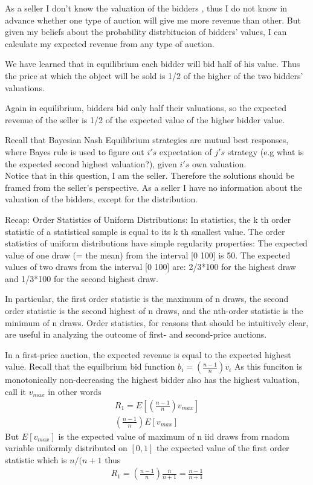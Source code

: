 \documentclass[11pt]{article} %
\begin{document}
      
      As a seller I don't know the valuation of the bidders , thus I do not know in advance whether one type of auction will give me more revenue than other. But given my beliefs about the probability distrbitucion of bidders' values, I can calculate my expected revenue from any type of auction.
      
      We have learned that in equilibrium each bidder will bid half of his value. Thus the price at which the object will be sold is 1/2 of the higher of the two bidders' valuations.
      
      Again in equilibrium, bidders bid only half their valuations, so the expected revenue of the seller is 1/2 of the expected value of the higher bidder value.
        
         Recall that Bayesian Nash Equilibrium strategies are mutual best responses, where Bayes rule is used to figure out $i's$ expectation of $j's$ strategy (e.g what is the expected second highest valuation?), given $i's$ own valuation. \\
    Notice that in this question, I am the seller. Therefore the solutions should be framed from the seller's perspective. As a seller I have no information about the valuation of the bidders, except for the distribution.
    
    Recap: Order Statistics of Uniform Distributions:
In statistics, the k th order statistic of a statistical sample is equal to its k th smallest value.  The order statistics of uniform distributions have simple regularity properties: The expected value of one draw (= the mean) from the interval [0 100] is 50. The expected values of two draws from the interval [0 100] are: 2/3*100 for the highest draw and 1/3*100 for the second highest draw. 

In particular, the first order statistic is the maximum of n draws, the second order statistic is the second highest of n draws, and the nth-order statistic is the minimum of n draws. Order statistics, for reasons that should be intuitively clear, are useful in analyzing the outcome of first- and second-price auctions.
     
     
     In a first-price auction, the expected revenue is equal to the expected highest value. Recall that the equilbrium bid function $b_i=(\frac{n-1}{n})v_i$ As this funciton is monotonically non-decreasing the highest bidder also has the highest valuation, call it $v_{max}$ in other words
     \begin{align*}
     R_1 = E[(\frac{n-1}{n})v_{max}] \\
     (\frac{n-1}{n})E[v_{max}]
     \end{align*}
But $E[v_{max}]$ is the expected value of maximum of n iid draws from rnadom variable uniformly distributed on $[0,1]$ the expected value of the first order statistic which is $n/(n+1$ thus 
     \begin{align*}
     R_1 =  (\frac{n-1}{n})\frac{n}{n+1} = \frac{n-1}{n+1}
     \end{align*}
     
\end{document}
